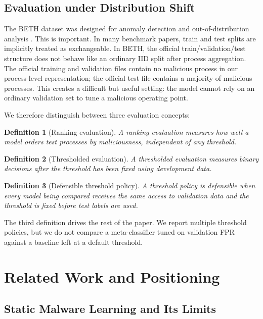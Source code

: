 \documentclass[10pt,journal,compsoc]{IEEEtran}
\newtheorem{definition}{Definition}
\begin{document}
\subsection{Evaluation under Distribution Shift}

The BETH dataset was designed for anomaly detection and out-of-distribution analysis \cite{highnam2021}. This is important. In many benchmark papers, train and test splits are implicitly treated as exchangeable. In BETH, the official train/validation/test structure does not behave like an ordinary IID split after process aggregation. The official training and validation files contain no malicious process in our process-level representation; the official test file contains a majority of malicious processes. This creates a difficult but useful setting: the model cannot rely on an ordinary validation set to tune a malicious operating point.

We therefore distinguish between three evaluation concepts:
\begin{definition}[Ranking evaluation]
A ranking evaluation measures how well a model orders test processes by maliciousness, independent of any threshold.
\end{definition}

\begin{definition}[Thresholded evaluation]
A thresholded evaluation measures binary decisions after the threshold has been fixed using development data.
\end{definition}

\begin{definition}[Defensible threshold policy]
A threshold policy is defensible when every model being compared receives the same access to validation data and the threshold is fixed before test labels are used.
\end{definition}

The third definition drives the rest of the paper. We report multiple threshold policies, but we do not compare a meta-classifier tuned on validation FPR against a baseline left at a default threshold.

\section{Related Work and Positioning}
\label{sec:related}

\subsection{Static Malware Learning and Its Limits}
\end{document}
